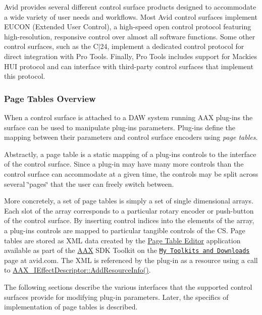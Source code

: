 Avid provides several different control surface products designed to accommodate a wide variety of user needs and workflows. Most Avid control surfaces implement E\+U\+C\+O\+N (Extended User Control), a high-\/speed open control protocol featuring high-\/resolution, responsive control over almost all software functions. Some other control surfaces, such as the C$\vert$24, implement a dedicated control protocol for direct integration with Pro Tools. Finally, Pro Tools includes support for Mackie\textquotesingle{}s H\+U\+I protocol and can interface with third-\/party control surfaces that implement this protocol.

\hypertarget{a00363_subsection__page_tables_overview}{}\subsubsection{Page Tables Overview}\label{a00363_subsection__page_tables_overview}
When a control surface is attached to a D\+A\+W system running A\+A\+X plug-\/ins the surface can be used to manipulate plug-\/ins\textquotesingle{} parameters. Plug-\/ins define the mapping between their parameters and control surface encoders using {\itshape page tables}.

Abstractly, a page table is a static mapping of a plug-\/in\textquotesingle{}s controls to the interface of the control surface. Since a plug-\/in may have many more controls than the control surface can accommodate at a given time, the controls may be split across several \char`\"{}pages\char`\"{} that the user can freely switch between.

More concretely, a set of page tables is simply a set of single dimensional arrays. Each slot of the array corresponds to a particular rotary encoder or push-\/button of the control surface. By inserting control indices into the elements of the array, a plug-\/in\textquotesingle{}s controls are mapped to particular tangible controls of the C\+S. Page tables are stored as X\+M\+L data created by the \hyperlink{a00363_subsection_creating_page_tables_in_pete}{Page Table Editor} application available as part of the \hyperlink{a00288}{A\+A\+X} S\+D\+K Toolkit on the \href{https://my.avid.com/products/cppsdk}{\tt My Toolkits and Downloads} page at avid.\+com. The X\+M\+L is referenced by the plug-\/in as a resource using a call to \hyperlink{a00096_a3326bd8e29690a352408539029a50a61}{A\+A\+X\+\_\+\+I\+Effect\+Descriptor\+::\+Add\+Resource\+Info()}.

The following sections describe the various interfaces that the supported control surfaces provide for modifying plug-\/in parameters. Later, the specifics of implementation of page tables is described. 

